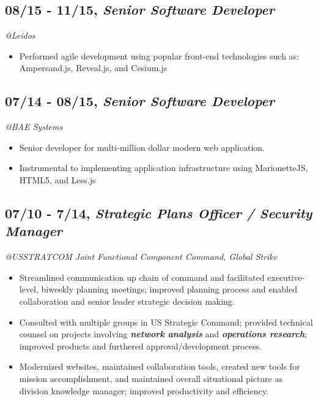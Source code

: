 \documentclass[10pt]{article}
\begin{document}
\subsection{08/15 - 11/15, \textbf{\emph{Senior Software
Developer}}}\label{senior-software-developer}

\emph{@Leidos }

\begin{itemize}
\itemsep1pt\parskip0pt
\item
  Performed agile development using popular front-end technologies such
  as: Ampersand.js, Reveal.js, and Cesium.js
\end{itemize}

\subsection{07/14 - 08/15, \textbf{\emph{Senior Software
Developer}}}\label{senior-software-developer-1}

\emph{@BAE Systems }

\begin{itemize}
\itemsep1pt\parskip0pt
\item
  Senior developer for multi-million dollar modern web application.
\item
  Instrumental to implementing application infrastructure using
  MarionetteJS, HTML5, and Less.js
\end{itemize}

\subsection{07/10 - 7/14, \textbf{\emph{Strategic Plans Officer /
Security Manager}}}\label{strategic-plans-officer-security-manager}

\emph{@USSTRATCOM Joint Functional Component Command, Global Strike}

\begin{itemize}
\itemsep1pt\parskip0pt
\item
  Streamlined communication up chain of command and facilitated
  executive-level, biweekly planning meetings; improved planning process
  and enabled collaboration and senior leader strategic decision making.
\item
  Consulted with multiple groups in US Strategic Command; provided
  technical counsel on projects involving \textbf{\emph{network
  analysis}} and \textbf{\emph{operations research}}; improved products
  and furthered approval/development process.
\item
  Modernized websites, maintained collaboration tools, created new tools
  for mission accomplishment, and maintained overall situational picture
  as division knowledge manager; improved productivity and efficiency.
\end{itemize}
\end{document}
